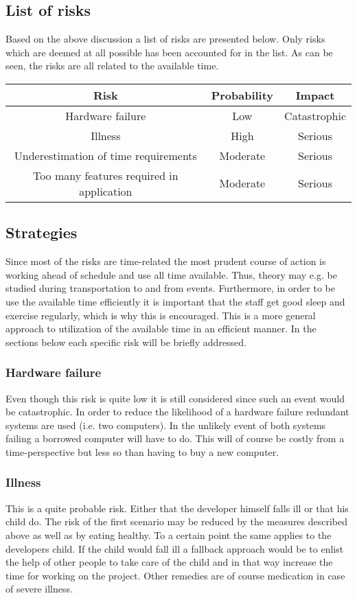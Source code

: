 \documentclass[12pt, letterpaper]{article}
\begin{document}
\subsection{List of risks}
Based on the above discussion a list of risks are presented below. Only risks which are deemed at all possible has been accounted for in the list. As can be seen, the risks are all related to the available time.
\begin{center}
	\begin{tabular}{|c|c|c|} 
		\hline
		Risk & Probability & Impact\\ [0.5ex] 
		\hline\hline
		Hardware failure & Low & Catastrophic \\ 
		\hline
		Illness & High & Serious \\
		\hline
		Underestimation of time requirements & Moderate & Serious \\ 
		\hline
		Too many features required in application & Moderate & Serious \\ 
		\hline
		
	\end{tabular}
\end{center}
\subsection{Strategies}
Since most of the risks are time-related the most prudent course of action is working ahead of schedule and use all time available. Thus, theory may e.g. be studied during transportation to and from events. Furthermore, in order to be use the available time efficiently it is important that the staff get good sleep and exercise regularly, which is why this is encouraged. This is a more general approach to utilization of the available time in an efficient manner. In the sections below each specific risk will be briefly addressed.
\subsubsection{Hardware failure}
Even though this risk is quite low it is still considered since such an event would be catastrophic. In order to reduce the likelihood of a hardware failure redundant systems are used (i.e. two computers). In the unlikely event of both systems failing a borrowed computer will have to do. This will of course be costly from a time-perspective but less so than having to buy a new computer.
\subsubsection{Illness}
This is a quite probable risk. Either that the developer himself falls ill or that his child do. The risk of the first scenario may be reduced by the measures described above as well as by eating healthy. To a certain point the same applies to the developers child. If the child would fall ill a fallback approach would be to enlist the help of other people to take care of the child and in that way increase the time for working on the project. Other remedies are of course medication in case of severe illness.
\end{document}

